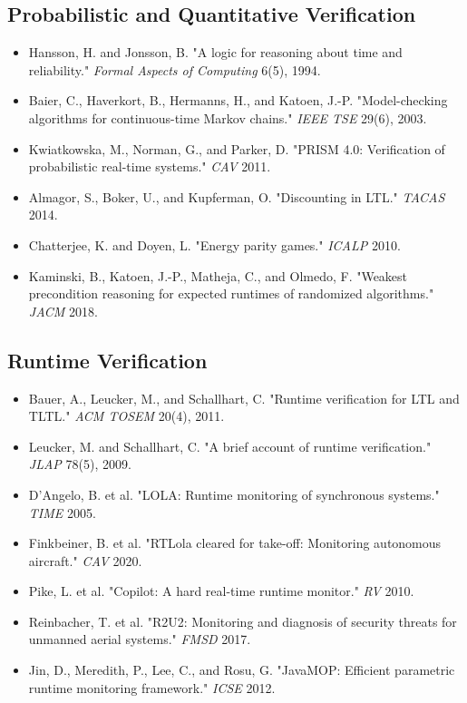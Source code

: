 \documentclass[11pt]{article}
\begin{document}
\subsection{Probabilistic and Quantitative Verification}
\label{sec:org1ea8744}
\begin{itemize}
\item Hansson, H. and Jonsson, B. "A logic for reasoning about time and reliability." \emph{Formal Aspects of Computing} 6(5), 1994.
\item Baier, C., Haverkort, B., Hermanns, H., and Katoen, J.-P. "Model-checking algorithms for continuous-time Markov chains." \emph{IEEE TSE} 29(6), 2003.
\item Kwiatkowska, M., Norman, G., and Parker, D. "PRISM 4.0: Verification of probabilistic real-time systems." \emph{CAV} 2011.
\item Almagor, S., Boker, U., and Kupferman, O. "Discounting in LTL." \emph{TACAS} 2014.
\item Chatterjee, K. and Doyen, L. "Energy parity games." \emph{ICALP} 2010.
\item Kaminski, B., Katoen, J.-P., Matheja, C., and Olmedo, F. "Weakest precondition reasoning for expected runtimes of randomized algorithms." \emph{JACM} 2018.
\end{itemize}
\subsection{Runtime Verification}
\label{sec:orgcb36ad3}
\begin{itemize}
\item Bauer, A., Leucker, M., and Schallhart, C. "Runtime verification for LTL and TLTL." \emph{ACM TOSEM} 20(4), 2011.
\item Leucker, M. and Schallhart, C. "A brief account of runtime verification." \emph{JLAP} 78(5), 2009.
\item D'Angelo, B. et al. "LOLA: Runtime monitoring of synchronous systems." \emph{TIME} 2005.
\item Finkbeiner, B. et al. "RTLola cleared for take-off: Monitoring autonomous aircraft." \emph{CAV} 2020.
\item Pike, L. et al. "Copilot: A hard real-time runtime monitor." \emph{RV} 2010.
\item Reinbacher, T. et al. "R2U2: Monitoring and diagnosis of security threats for unmanned aerial systems." \emph{FMSD} 2017.
\item Jin, D., Meredith, P., Lee, C., and Rosu, G. "JavaMOP: Efficient parametric runtime monitoring framework." \emph{ICSE} 2012.
\end{itemize}
\end{document}
